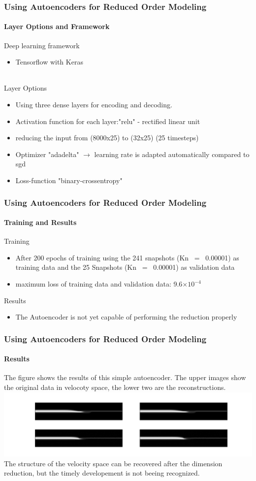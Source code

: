 \documentclass{beamer}
\begin{document}
	\begin{frame}[fragile]
		\frametitle{Using Autoencoders for Reduced Order Modeling}
			\framesubtitle{Layer Options and Framework}
			Deep learning framework
			\begin{itemize}
				\item Tensorflow with Keras
			\end{itemize}\\
			Layer Options
			\begin{itemize}
				\item Using three dense layers for encoding and decoding.
				\item Activation function for each layer:"relu" - rectified linear unit
				\item reducing the input from (8000x25) to (32x25) (25 timesteps)
				\item Optimizer "adadelta" $\rightarrow$ learning rate is adapted automatically compared to sgd
				\item Loss-function "binary-crossentropy"
			\end{itemize}	
	\end{frame}
	\begin{frame}
		\frametitle{Using Autoencoders for Reduced Order Modeling}
			 \framesubtitle{Training and Results}
			 Training
			 \begin{itemize}
			 	\item After 200 epochs of training using the 241 snapshots (Kn~ =~ 0.00001) as training data and the 25 Snapshots (Kn~ =~ 0.00001) as validation data
			 	\item maximum loss of training data and validation data: 9.6$\times10^{-4}$
			 \end{itemize}
		 		Results
		 	\begin{itemize}
		 		\item The Autoencoder is not yet capable of performing the reduction properly
		 	\end{itemize}
	\end{frame}
	\begin{frame}
		\frametitle{Using Autoencoders for Reduced Order Modeling}
			\framesubtitle{Results}
			The figure shows the results of this simple autoencoder. The upper images show the original data in velocoty space, the lower two are the reconstructions. 
			\includegraphics[width=\textwidth, height=0.47\textheight]{figures/B20E1k.png}
			The structure of the velocity space can be recovered after the dimension reduction, but the timely developement is not beeing recognized.
	\end{frame}
\end{document}
